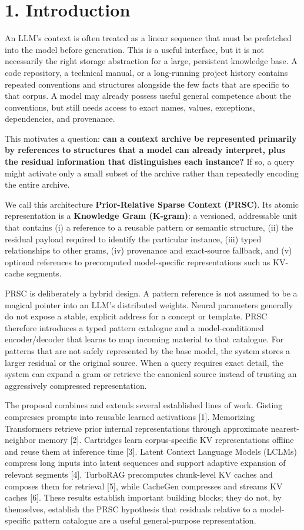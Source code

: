 \documentclass[
  10pt,
]{article}
\begin{document}
\section{1. Introduction}\label{introduction}

An LLM's context is often treated as a linear sequence that must be
prefetched into the model before generation. This is a useful interface,
but it is not necessarily the right storage abstraction for a large,
persistent knowledge base. A code repository, a technical manual, or a
long-running project history contains repeated conventions and
structures alongside the few facts that are specific to that corpus. A
model may already possess useful general competence about the
conventions, but still needs access to exact names, values, exceptions,
dependencies, and provenance.

This motivates a question: \textbf{can a context archive be represented
primarily by references to structures that a model can already
interpret, plus the residual information that distinguishes each
instance?} If so, a query might activate only a small subset of the
archive rather than repeatedly encoding the entire archive.

We call this architecture \textbf{Prior-Relative Sparse Context (PRSC)}.
Its atomic representation is a \textbf{Knowledge Gram (K-gram)}: a
versioned, addressable unit that contains (i) a reference to a reusable
pattern or semantic structure, (ii) the residual payload required to
identify the particular instance, (iii) typed relationships to other
grams, (iv) provenance and exact-source fallback, and (v) optional
references to precomputed model-specific representations such as
KV-cache segments.

PRSC is deliberately a hybrid design. A pattern reference is not assumed
to be a magical pointer into an LLM's distributed weights. Neural
parameters generally do not expose a stable, explicit address for a
concept or template. PRSC therefore introduces a typed pattern catalogue
and a model-conditioned encoder/decoder that learns to map incoming
material to that catalogue. For patterns that are not safely represented
by the base model, the system stores a larger residual or the original
source. When a query requires exact detail, the system can expand a gram
or retrieve the canonical source instead of trusting an aggressively
compressed representation.

The proposal combines and extends several established lines of work.
Gisting compresses prompts into reusable learned activations {[}1{]}.
Memorizing Transformers retrieve prior internal representations through
approximate nearest-neighbor memory {[}2{]}. Cartridges learn
corpus-specific KV representations offline and reuse them at inference
time {[}3{]}. Latent Context Language Models (LCLMs) compress long
inputs into latent sequences and support adaptive expansion of relevant
segments {[}4{]}. TurboRAG precomputes chunk-level KV caches and
composes them for retrieval {[}5{]}, while CacheGen compresses and
streams KV caches {[}6{]}. These results establish important building
blocks; they do not, by themselves, establish the PRSC hypothesis that
residuals relative to a model-specific pattern catalogue are a useful
general-purpose representation.
\end{document}
